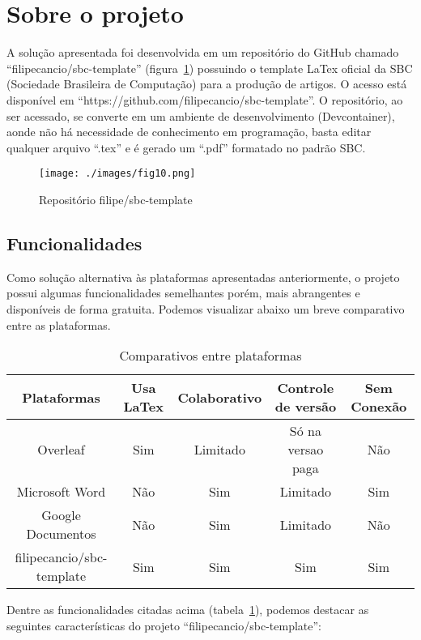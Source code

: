 \section{Sobre o projeto}

A solução apresentada foi desenvolvida em um repositório do GitHub chamado ``filipecancio/sbc-template'' (figura~\ref{fig:fig10}) possuindo o template LaTex oficial da SBC (Sociedade Brasileira de Computação) para a produção de artigos. O acesso está disponível em ``https://github.com/filipecancio/sbc-template''. O repositório, ao ser acessado, se converte em um ambiente de desenvolvimento (Devcontainer), aonde não há necessidade de conhecimento em programação, basta editar qualquer arquivo ``.tex'' e é gerado um ``.pdf'' formatado no padrão SBC.

\begin{figure}[ht]
	\centering
	\texttt{[image: ./images/fig10.png]}
	\caption{Repositório filipe/sbc-template}
	\label{fig:fig10}
\end{figure}

\subsection{Funcionalidades}

Como solução alternativa às plataformas apresentadas anteriormente, o projeto possui algumas funcionalidades semelhantes porém, mais abrangentes e disponíveis de forma gratuita. Podemos visualizar abaixo um breve comparativo entre as plataformas.

\begin{table}[ht]
	\centering
	\begin{tabular}{|c|c|c|c|c|}
		\hline
		Plataformas & Usa LaTex & Colaborativo & Controle de versão & Sem Conexão
		\\
		\hline
		Overleaf & Sim & Limitado & Só na versao paga & Não \\
		\hline
		Microsoft Word & Não & Sim & Limitado & Sim \\
		\hline
		Google Documentos & Não & Sim & Limitado & Não \\
		\hline
		filipecancio/sbc-template & Sim & Sim & Sim & Sim \\
		\hline
	\end{tabular}
	\caption{Comparativos entre plataformas}
	\label{tab:tabela01}
\end{table}

Dentre as funcionalidades citadas acima (tabela~\ref{tab:tabela01}), podemos destacar as seguintes características do projeto ``filipecancio/sbc-template'':

